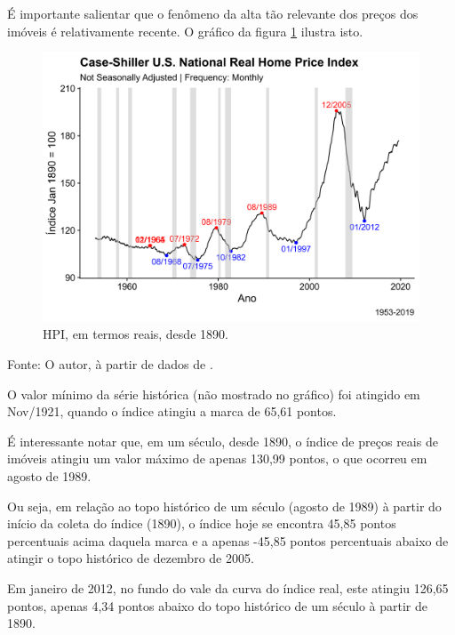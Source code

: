\documentclass[
	12pt,				%
	oneside,			%
	a4paper,			%
	chapter=TITLE,		%
	section=TITLE,		%
	english,			%
	brazil				%
	]{abntex2}
\newcommand{\bcenter}{\begin{center}}
\newcommand{\ecenter}{\end{center}}
\begin{document}
É importante salientar que o fenômeno da alta tão relevante dos preços dos
imóveis é relativamente recente. O gráfico da figura \ref{fig:rhpi2} ilustra
isto.
\begin{figure}[H]

{\centering \includegraphics[width=0.7\linewidth]{images/rhpi2-1} 

}

\caption{HPI, em termos reais, desde 1890.}\label{fig:rhpi2}
\end{figure}
\bcenter

Fonte: O autor, à partir de dados de \textcite{QuandlWIKI}.
\ecenter

O valor mínimo da série histórica (não mostrado no gráfico) foi atingido em\\
Nov/1921, quando o índice atingiu a marca de 65,61 pontos.

É interessante notar que, em um século, desde 1890, o índice de preços reais de
imóveis atingiu um valor máximo de apenas 130,99
pontos, o que ocorreu em agosto de 1989.

Ou seja, em relação ao topo histórico de um século (agosto de 1989) à partir do
início da coleta do índice (1890), o índice hoje se encontra
45,85 pontos percentuais acima daquela
marca e a apenas -45,85 pontos
percentuais abaixo de atingir o topo histórico de dezembro de 2005.

Em janeiro de 2012, no fundo do vale da curva do índice real, este atingiu
126,65 pontos, apenas
4,34 pontos abaixo do topo
histórico de um século à partir de 1890.
\end{document}
